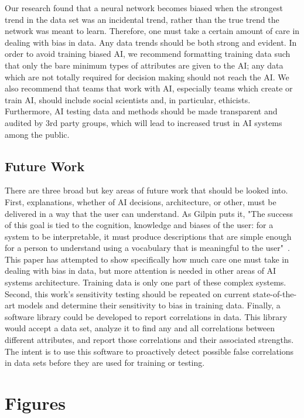 \documentclass[paper=a4paper]{report}
\begin{document}
Our research found that a neural network becomes biased when the strongest trend in the data set was
an incidental trend, rather than the true trend the network was meant to learn. Therefore, one must
take a certain amount of care in dealing with bias in data. Any data trends should be both strong
and evident. In order to avoid training biased AI, we recommend formatting training data such that
only the bare minimum types of attributes are given to the AI; any data which are not totally
required for decision making should not reach the AI. We also recommend that teams that work with
AI, especially teams which create or train AI, should include social scientists and, in particular,
ethicists. Furthermore, AI testing data and methods should be made transparent and audited by 3rd
party groups, which will lead to increased trust in AI systems among the public.

\FloatBarrier
\section{Future Work}

There are three broad but key areas of future work that should be looked into. First, explanations,
whether of AI decisions, architecture, or other, must be delivered in a way that the user can
understand. As Gilpin puts it, "The success of this goal is tied to the cognition, knowledge and
biases of the user: for a system to be interpretable, it must produce descriptions that are simple
enough for a person to understand using a vocabulary that is meaningful to the
user"~\cite{gilpin2018explaining}. This paper has attempted to show specifically how much care one
must take in dealing with bias in data, but more attention is needed in other areas of AI systems
architecture. Training data is only one part of these complex systems. Second, this work's
sensitivity testing should be repeated on current state-of-the-art models and determine their
sensitivity to bias in training data. Finally, a software library could be developed to report
correlations in data. This library would accept a data set, analyze it to find any and all
correlations between different attributes, and report those correlations and their associated
strengths. The intent is to use this software to proactively detect possible false correlations in
data sets before they are used for training or testing.




\appendix
\chapter{Figures}
\end{document}
